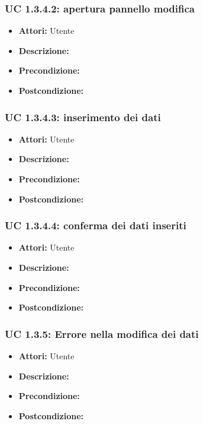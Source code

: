 \subsubsection{UC 1.3.4.2: apertura pannello modifica}

\begin{itemize}
\item \textbf{Attori:} Utente
\item \textbf{Descrizione:} 
\item \textbf{Precondizione:} 
\item \textbf{Postcondizione:} 
\end{itemize}

\subsubsection{UC 1.3.4.3: inserimento dei dati}

\begin{itemize}
\item \textbf{Attori:} Utente
\item \textbf{Descrizione:} 
\item \textbf{Precondizione:} 
\item \textbf{Postcondizione:} 
\end{itemize}

\subsubsection{UC 1.3.4.4: conferma dei dati inseriti}

\begin{itemize}
\item \textbf{Attori:} Utente
\item \textbf{Descrizione:} 
\item \textbf{Precondizione:} 
\item \textbf{Postcondizione:} 
\end{itemize}

\subsubsection{UC 1.3.5: Errore nella modifica dei dati}

\begin{itemize}
\item \textbf{Attori:} Utente
\item \textbf{Descrizione:} 
\item \textbf{Precondizione:} 
\item \textbf{Postcondizione:} 
\end{itemize}

